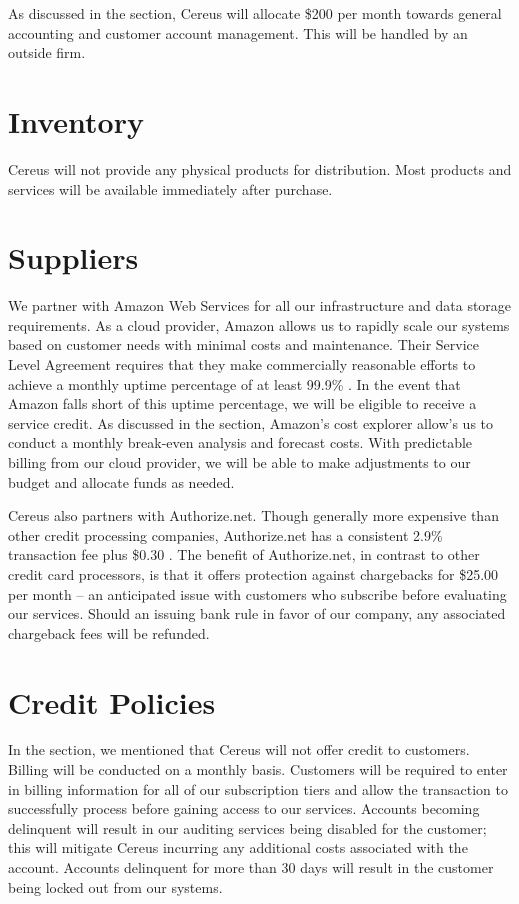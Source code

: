 As discussed in the  section, Cereus will allocate \$200 per month towards general accounting and customer account management. This will be handled by an outside firm.

\section{Inventory}

Cereus will not provide any physical products for distribution. Most products and services will be available immediately after purchase.

\section{Suppliers}

We partner with Amazon Web Services for all our infrastructure and data storage requirements. As a cloud provider, Amazon allows us to rapidly scale our systems based on customer needs with minimal costs and maintenance. Their Service Level Agreement requires that they make commercially reasonable efforts to achieve a monthly uptime percentage of at least 99.9\% \cite{amazon.2019}. In the event that Amazon falls short of this uptime percentage, we will be eligible to receive a service credit. As discussed in the  section, Amazon's cost explorer allow's us to conduct a monthly break-even analysis and forecast costs. With predictable billing from our cloud provider, we will be able to make adjustments to our budget and allocate funds as needed.

Cereus also partners with Authorize.net. Though generally more expensive than other credit processing companies, Authorize.net has a consistent 2.9\% transaction fee plus \$0.30 \cite{yowana.2019}. The benefit of Authorize.net, in contrast to other credit card processors, is that it offers protection against chargebacks for \$25.00 per month -- an anticipated issue with customers who subscribe before evaluating our services. Should an issuing bank rule in favor of our company, any associated chargeback fees will be refunded.

\section{Credit Policies}

In the  section, we mentioned that Cereus will not offer credit to customers. Billing will be conducted on a monthly basis. Customers will be required to enter in billing information for all of our subscription tiers and allow the transaction to successfully process before gaining access to our services. Accounts becoming delinquent will result in our auditing services being disabled for the customer; this will mitigate Cereus incurring any additional costs associated with the account. Accounts delinquent for more than 30 days will result in the customer being locked out from our systems.
